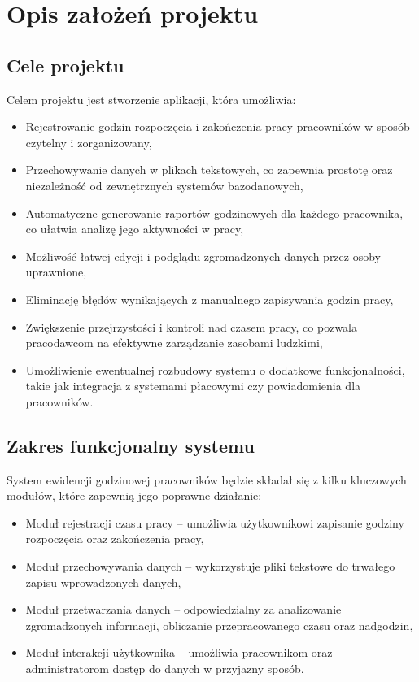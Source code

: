 \chapter{Opis założeń projektu}
\section{Cele projektu}
\noindent Celem projektu jest stworzenie aplikacji, która umożliwia:
\begin{itemize}
    \item Rejestrowanie godzin rozpoczęcia i zakończenia pracy pracowników w sposób czytelny i zorganizowany,
    \item Przechowywanie danych w plikach tekstowych, co zapewnia prostotę oraz niezależność od zewnętrznych systemów bazodanowych,
    \item Automatyczne generowanie raportów godzinowych dla każdego pracownika, co ułatwia analizę jego aktywności w pracy,
    \item Możliwość łatwej edycji i podglądu zgromadzonych danych przez osoby uprawnione,
    \item Eliminację błędów wynikających z manualnego zapisywania godzin pracy,
    \item Zwiększenie przejrzystości i kontroli nad czasem pracy, co pozwala pracodawcom na efektywne zarządzanie zasobami ludzkimi,
    \item Umożliwienie ewentualnej rozbudowy systemu o dodatkowe funkcjonalności, takie jak integracja z systemami płacowymi czy powiadomienia dla pracowników.
\end{itemize}

\section{Zakres funkcjonalny systemu}
\noindent System ewidencji godzinowej pracowników będzie składał się z kilku kluczowych modułów, które zapewnią jego poprawne działanie:
\begin{itemize}
    \item Moduł rejestracji czasu pracy – umożliwia użytkownikowi zapisanie godziny rozpoczęcia oraz zakończenia pracy,
    \item Moduł przechowywania danych – wykorzystuje pliki tekstowe do trwałego zapisu wprowadzonych danych,
    \item Moduł przetwarzania danych – odpowiedzialny za analizowanie zgromadzonych informacji, obliczanie przepracowanego czasu oraz nadgodzin,
    \item Moduł interakcji użytkownika – umożliwia pracownikom oraz administratorom dostęp do danych w przyjazny sposób.
\end{itemize}

